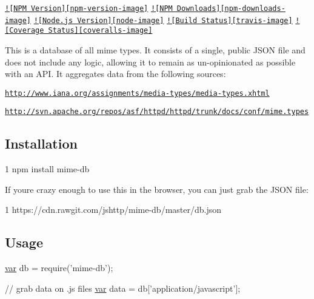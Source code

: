 \href{https://npmjs.org/package/mime-db}{\tt !\mbox{[}N\+P\+M Version\mbox{]}\mbox{[}npm-\/version-\/image\mbox{]}} \href{https://npmjs.org/package/mime-db}{\tt !\mbox{[}N\+P\+M Downloads\mbox{]}\mbox{[}npm-\/downloads-\/image\mbox{]}} \href{http://nodejs.org/download/}{\tt !\mbox{[}Node.\+js Version\mbox{]}\mbox{[}node-\/image\mbox{]}} \href{https://travis-ci.org/jshttp/mime-db}{\tt !\mbox{[}Build Status\mbox{]}\mbox{[}travis-\/image\mbox{]}} \href{https://coveralls.io/r/jshttp/mime-db?branch=master}{\tt !\mbox{[}Coverage Status\mbox{]}\mbox{[}coveralls-\/image\mbox{]}}

This is a database of all mime types. It consists of a single, public J\+S\+O\+N file and does not include any logic, allowing it to remain as un-\/opinionated as possible with an A\+P\+I. It aggregates data from the following sources\+:


\begin{DoxyItemize}
\item \href{http://www.iana.org/assignments/media-types/media-types.xhtml}{\tt http\+://www.\+iana.\+org/assignments/media-\/types/media-\/types.\+xhtml}
\item \href{http://svn.apache.org/repos/asf/httpd/httpd/trunk/docs/conf/mime.types}{\tt http\+://svn.\+apache.\+org/repos/asf/httpd/httpd/trunk/docs/conf/mime.\+types}
\end{DoxyItemize}

\subsection*{Installation}


\begin{DoxyCode}
1 npm install mime-db
\end{DoxyCode}


If you\textquotesingle{}re crazy enough to use this in the browser, you can just grab the J\+S\+O\+N file\+:


\begin{DoxyCode}
1 https://cdn.rawgit.com/jshttp/mime-db/master/db.json
\end{DoxyCode}


\subsection*{Usage}


\begin{DoxyCode}
\hyperlink{018__def_8c_a335628f2e9085305224b4f9cc6e95ed5}{var} db = require(\textcolor{stringliteral}{'mime-db'});

\textcolor{comment}{// grab data on .js files}
\hyperlink{018__def_8c_a335628f2e9085305224b4f9cc6e95ed5}{var} data = db[\textcolor{stringliteral}{'application/javascript'}];
\end{DoxyCode}


